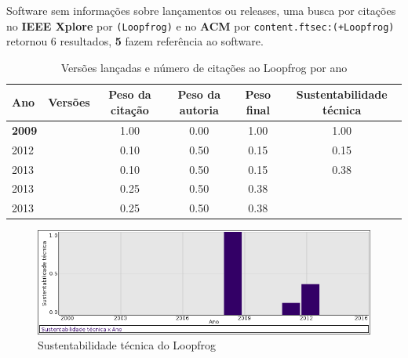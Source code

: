 Software sem informações sobre lançamentos ou releases,
uma busca por citações no {\bf IEEE Xplore} por
\texttt{(Loopfrog)}
e no {\bf ACM} por
\texttt{content.ftsec:(+Loopfrog)}
retornou
6 resultados,
{\bf 5} fazem referência ao software.


\begin{table}[H]
\caption{Versões lançadas e número de citações ao Loopfrog por ano}
\centering
\begin{tabular}{| l | c | c | c | c | c |}
  \hline
  Ano & Versões & Peso da citação & Peso da autoria & Peso final & Sustentabilidade técnica \\
  \hline
            {\bf 2009}
          &
          
          &
          1.00
          &
          0.00
          &
          1.00
          &
            {\color{blue} 1.00}
          \\
\hline
            2012
          &
          
          &
          0.10
          &
          0.50
          &
          0.15
          &
            {\color{red} 0.15}
          \\
\hline
            2013
          &
          
          &
          0.10
          &
          0.50
          &
          0.15
          &
            {\color{red} 0.38}
          \\
            2013
          &
          
          &
          0.25
          &
          0.50
          &
          0.38
          &
          \\
            2013
          &
          
          &
          0.25
          &
          0.50
          &
          0.38
          &
          \\
\hline
\end{tabular}
\end{table}

\begin{figure}[h]
  \center
  \includegraphics[scale=0.50]{result-documents/charts/loopfrog.png}
  \caption{Sustentabilidade técnica do Loopfrog}
\end{figure}


